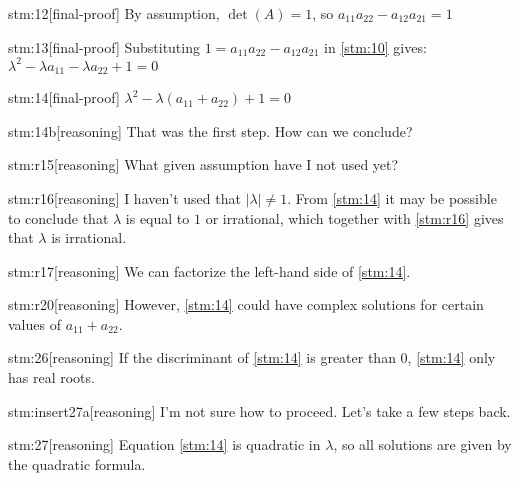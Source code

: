 \begin{stm}{stm:12}[final-proof]
By assumption, $\det(A) = 1$, so $a_{11}a_{22} - a_{12}a_{21} = 1$
\end{stm}

\begin{stm}{stm:13}[final-proof]
Substituting $1 = a_{11}a_{22} - a_{12}a_{21}$ in \ref{stm:10} gives: $\lambda^2 - \lambda a_{11} - \lambda a_{22} + 1 = 0$
\end{stm}

\begin{stm}{stm:14}[final-proof]
$\lambda^2 - \lambda(a_{11} + a_{22}) + 1 = 0$
\end{stm}

\begin{stm}{stm:14b}[reasoning]
That was the first step. How can we conclude?
\end{stm}

\begin{stm}{stm:r15}[reasoning]
What given assumption have I not used yet?
\end{stm}

\begin{stm}{stm:r16}[reasoning]
I haven't used that $|\lambda| \ne 1$. From \ref{stm:14} it may be possible to conclude that $\lambda$ is equal to $1$ or irrational, which together with \ref{stm:r16} gives that $\lambda$ is irrational.
\end{stm}

\begin{stm}{stm:r17}[reasoning]
We can factorize the left-hand side of \ref{stm:14}.
\end{stm}

\begin{stm}{stm:r20}[reasoning]
However, \ref{stm:14} could have complex solutions for certain values of $a_{11} + a_{22}$.
\end{stm}

\begin{stm}{stm:26}[reasoning]
If the discriminant of \ref{stm:14} is greater than $0$, \ref{stm:14} only has real roots.
\end{stm}

\begin{stm}{stm:insert27a}[reasoning]
I'm not sure how to proceed. Let's take a few steps back.
\end{stm}

\begin{stm}{stm:27}[reasoning]
Equation \ref{stm:14} is quadratic in $\lambda$, so all solutions are given by the quadratic formula.
\end{stm}


